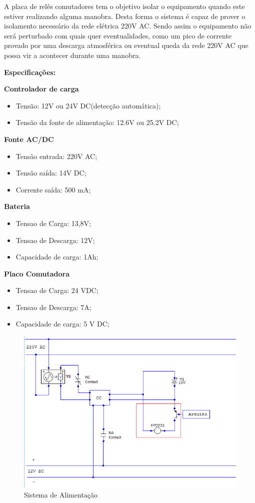A placa de relês comutadores tem o objetivo isolar o equipamento quando este estiver realizando alguma manobra. Desta forma o sistema é capaz de prover o isolamento necessário da rede elétrica 220V AC. Sendo assim o equipamento não será perturbado com quais quer eventualidades, como um pico de corrente provado por uma descarga atmosférica ou eventual queda da rede 220V AC que possa vir a acontecer durante uma manobra. 


\textbf{Especificações:}

\textbf{Controlador de carga}
\begin{itemize}	
\item Tensão: 12V ou 24V DC(detecção automática);
\item Tensão da fonte de alimentação: 12.6V ou 25.2V DC;
\end{itemize}

\textbf{Fonte AC/DC}
\begin{itemize}
\item Tensão entrada: 220V AC;
\item Tensão saída: 14V DC;
\item Corrente saída: 500 mA;
\end{itemize}

\textbf{Bateria}
\begin{itemize}
\item Tensao de Carga: 13,8V;
\item Tensao de Descarga: 12V;
\item Capacidade de carga: 1Ah;
\end{itemize}

\textbf{Placo Comutadora}
\begin{itemize}
\item Tensao de Carga: 24 VDC;
\item Tensao de Descarga: 7A;
\item Capacidade de carga: 5 V DC;
\end{itemize}

\begin{figure}[H]
		\centering
			\includegraphics[scale= 0.7]{figuras/alimentacao.png}
		\caption{Sistema de Alimentação}
		\label{fig27}
\end{figure}